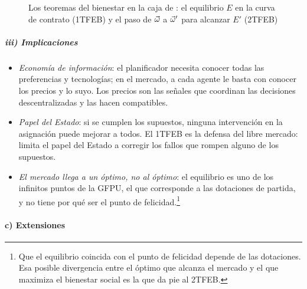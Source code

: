 \documentclass[11pt]{article}
\begin{document}
\begin{figure}[H]
\centering
\caption{Los teoremas del bienestar en la caja de : el equilibrio $E$ en la curva de contrato (1TFEB) y el paso de $\vec{\omega}$ a $\vec{\omega}'$ para alcanzar $E'$ (2TFEB)}\label{fig:caja-intercambio-teoremas}
\end{figure}

\subparagraph{iii) Implicaciones}

\begin{itemize}
\item \emph{Economía de información}: el planificador necesita conocer todas las preferencias y tecnologías; en el mercado, a cada agente le basta con conocer los precios y lo suyo\nocite{Hayek1945Use}. Los precios son las señales que coordinan las decisiones descentralizadas y las hacen compatibles.
\item \emph{Papel del Estado}: si se cumplen los supuestos, ninguna intervención en la asignación puede mejorar a todos. El 1TFEB es la defensa del libre mercado: limita el papel del Estado a corregir los fallos que rompen alguno de los supuestos.
\item \emph{El mercado llega a un óptimo, no al óptimo}: el equilibrio es uno de los infinitos puntos de la GFPU, el que corresponde a las dotaciones de partida, y no tiene por qué ser el punto de felicidad.\footnote{Que el equilibrio coincida con el punto de felicidad depende de las dotaciones. Esa posible divergencia entre el óptimo que alcanza el mercado y el que maximiza el bienestar social es la que da pie al 2TFEB.}
\end{itemize}

\paragraph{c) Extensiones}
\end{document}
